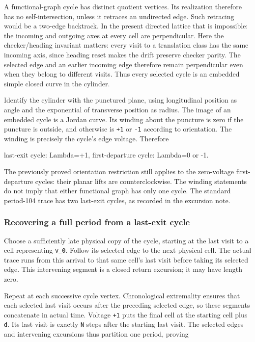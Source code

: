 \documentclass[11pt,letterpaper]{article}
\theoremstyle{plain}
\theoremstyle{definition}
\begin{document}
\begin{NoHyper}
A functional-graph cycle has distinct quotient vertices. Its realization therefore has no self-intersection, unless it retraces an undirected edge. Such retracing would be a two-edge backtrack. In the present directed lattice that is impossible: the incoming and outgoing axes at every cell are perpendicular. Here the checker/heading invariant matters: every visit to a translation class has the same incoming axis, since heading reset makes the drift preserve checker parity. The selected edge and an earlier incoming edge therefore remain perpendicular even when they belong to different visits. Thus every selected cycle is an embedded simple closed curve in the cylinder.

Identify the cylinder with the punctured plane, using longitudinal position as angle and the exponential of transverse position as radius. The image of an embedded cycle is a Jordan curve. Its winding about the puncture is zero if the puncture is outside, and otherwise is \texttt{+1} or \texttt{-1} according to orientation. The winding is precisely the cycle's edge voltage. Therefore

\begin{codeblock}
last-exit cycle:       Lambda=+1,
first-departure cycle: Lambda=0 or -1.
\end{codeblock}

The previously proved orientation restriction still applies to the zero-voltage first-departure cycles: their planar lifts are counterclockwise. The winding statements do not imply that either functional graph has only one cycle. The standard period-104 trace has two last-exit cycles, as recorded in the excursion note.

\subsubsection{Recovering a full period from a last-exit cycle}

Choose a sufficiently late physical copy of the cycle, starting at the last visit to a cell representing \texttt{v\_0}. Follow its selected edge to the next physical cell. The actual trace runs from this arrival to that same cell's last visit before taking its selected edge. This intervening segment is a closed return excursion; it may have length zero.

Repeat at each successive cycle vertex. Chronological extremality ensures that each selected last visit occurs after the preceding selected edge, so these segments concatenate in actual time. Voltage \texttt{+1} puts the final cell at the starting cell plus \texttt{d}. Its last visit is exactly \texttt{N} steps after the starting last visit. The selected edges and intervening excursions thus partition one period, proving


\end{NoHyper}
\end{document}
